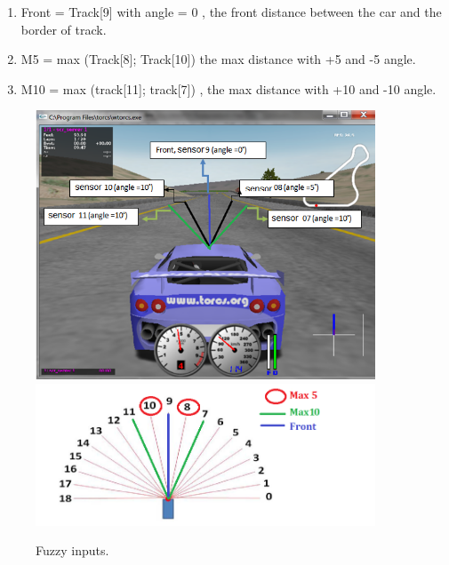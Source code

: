 \documentclass{llncs}
\begin{document}
\begin{enumerate}
	\item Front = Track[9]  with angle = 0 , the front distance between the car and the border of track.
	\item M5 = max (Track[8]; Track[10])
	the max distance with +5 and  -5 angle.
	\item M10 = max (track[11]; track[7]) ,	the max distance with +10 and  -10 angle.
\end{enumerate}
\begin{figure}[h!]
	
	\centering
	\includegraphics[width=0.9\textwidth]{fig/sensor22.png}
	\includegraphics[width=0.9\textwidth]{fig/front.png}
	\begin{minipage}{10cm}
		\centering
		\caption{\footnotesize Fuzzy inputs.}
		\label{fig34}
	\end{minipage} 		
\end{figure}
\newpage
\end{document}
